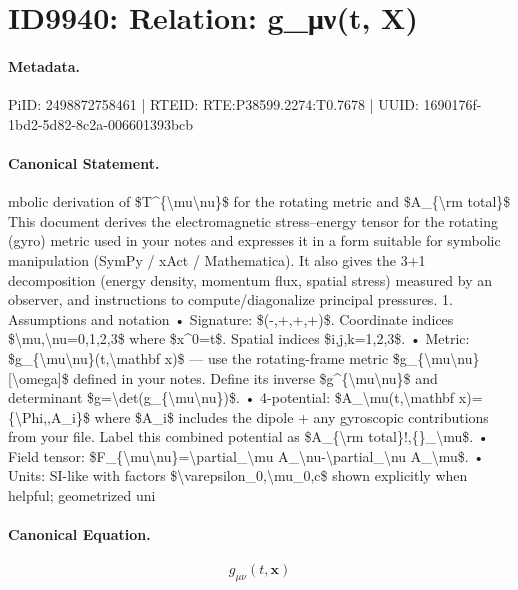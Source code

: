 \section*{ID9940: Relation: g\_μν(t, X)}
\paragraph{Metadata.}
PiID: 2498872758461 | RTEID: RTE:P38599.2274:T0.7678 | UUID: 1690176f-1bd2-5d82-8c2a-006601393bcb

\paragraph{Canonical Statement.}
mbolic derivation of \$T\textasciicircum{}\{\textbackslash{}mu\textbackslash{}nu\}\$ for the rotating metric and \$A\_\{\textbackslash{}rm total\}\$ This document derives the electromagnetic stress–energy tensor for the rotating (gyro) metric used in your notes and expresses it in a form suitable for symbolic manipulation (SymPy / xAct / Mathematica). It also gives the 3+1 decomposition (energy density, momentum flux, spatial stress) measured by an observer, and instructions to compute/diagonalize principal pressures. 1. Assumptions and notation • Signature: \$(-,+,+,+)\$. Coordinate indices \$\textbackslash{}mu,\textbackslash{}nu=0,1,2,3\$ where \$x\textasciicircum{}0=t\$. Spatial indices \$i,j,k=1,2,3\$. • Metric: \$g\_\{\textbackslash{}mu\textbackslash{}nu\}(t,\textbackslash{}mathbf x)\$ — use the rotating-frame metric \$g\_\{\textbackslash{}mu\textbackslash{}nu\}[\textbackslash{}omega]\$ defined in your notes. Define its inverse \$g\textasciicircum{}\{\textbackslash{}mu\textbackslash{}nu\}\$ and determinant \$g=\textbackslash{}det(g\_\{\textbackslash{}mu\textbackslash{}nu\})\$. • 4-potential: \$A\_\textbackslash{}mu(t,\textbackslash{}mathbf x)=\{\textbackslash{}Phi,,A\_i\}\$ where \$A\_i\$ includes the dipole + any gyroscopic contributions from your file. Label this combined potential as \$A\_\{\textbackslash{}rm total\}!,\{\}\_\textbackslash{}mu\$. • Field tensor: \$F\_\{\textbackslash{}mu\textbackslash{}nu\}=\textbackslash{}partial\_\textbackslash{}mu A\_\textbackslash{}nu-\textbackslash{}partial\_\textbackslash{}nu A\_\textbackslash{}mu\$. • Units: SI-like with factors \$\textbackslash{}varepsilon\_0,\textbackslash{}mu\_0,c\$ shown explicitly when helpful; geometrized uni

\paragraph{Canonical Equation.}
\[
g_{\mu\nu}(t,\mathbf x)
\]

